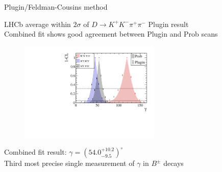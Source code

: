\documentclass[xcolor={dvipsnames}]{beamer}
\begin{document}
\begin{frame}{Plugin/Feldman-Cousins method}
  \begin{center}
    LHCb average within $2\sigma$ of $D\to K^+K^-\pi^+\pi^-$ Plugin result \\
    Combined fit shows good agreement between Plugin and Prob scans
  \end{center}
  \begin{figure}
    \centering
    \includegraphics[width=0.6\textwidth]{Plots/gamma_plugin_scan.pdf}
  \end{figure}
  \vspace{-0.3cm}
  \begin{center}
    Combined fit result: $\gamma = (54.0_{-9.5}^{+10.2})^\circ$ \\
    Third most precise single measurement of $\gamma$ in $B^\pm$ decays
  \end{center}
\end{frame}
\end{document}
